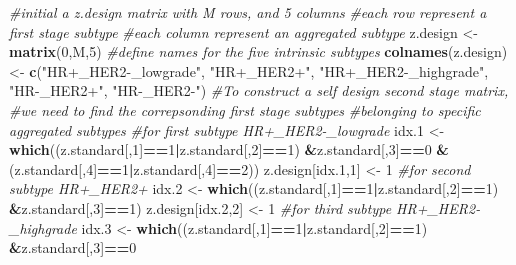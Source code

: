 \documentclass[11pt,]{article}
\newenvironment{Shaded}{\begin{snugshade}}{\end{snugshade}}
\newcommand{\KeywordTok}[1]{\textcolor[rgb]{0.13,0.29,0.53}{\textbf{#1}}}
\newcommand{\DecValTok}[1]{\textcolor[rgb]{0.00,0.00,0.81}{#1}}
\newcommand{\StringTok}[1]{\textcolor[rgb]{0.31,0.60,0.02}{#1}}
\newcommand{\CommentTok}[1]{\textcolor[rgb]{0.56,0.35,0.01}{\textit{#1}}}
\newcommand{\OperatorTok}[1]{\textcolor[rgb]{0.81,0.36,0.00}{\textbf{#1}}}
\newcommand{\NormalTok}[1]{#1}
\begin{document}
\begin{Shaded}
\begin{Highlighting}[]
\CommentTok{#initial a z.design matrix with M rows, and 5 columns}
\CommentTok{#each row represent a first stage subtype}
\CommentTok{#each column represent an aggregated subtype}
\NormalTok{z.design <-}\StringTok{ }\KeywordTok{matrix}\NormalTok{(}\DecValTok{0}\NormalTok{,M,}\DecValTok{5}\NormalTok{)}
\CommentTok{#define names for the five intrinsic subtypes}
\KeywordTok{colnames}\NormalTok{(z.design) <-}\StringTok{ }\KeywordTok{c}\NormalTok{(}\StringTok{"HR+_HER2-_lowgrade"}\NormalTok{,}
                        \StringTok{"HR+_HER2+"}\NormalTok{,}
                        \StringTok{"HR+_HER2-_highgrade"}\NormalTok{,}
                        \StringTok{"HR-_HER2+"}\NormalTok{, }
                        \StringTok{"HR-_HER2-"}\NormalTok{)}
\CommentTok{#To construct a self design second stage matrix,}
\CommentTok{#we need to find the correpsonding first stage subtypes}
\CommentTok{#belonging to specific aggregated subtypes}
\CommentTok{#for first subtype HR+_HER2-_lowgrade}
\NormalTok{idx.}\DecValTok{1}\NormalTok{ <-}\StringTok{ }\KeywordTok{which}\NormalTok{((z.standard[,}\DecValTok{1}\NormalTok{]}\OperatorTok{==}\DecValTok{1}\OperatorTok{|}\NormalTok{z.standard[,}\DecValTok{2}\NormalTok{]}\OperatorTok{==}\DecValTok{1}\NormalTok{)}
               \OperatorTok{&}\NormalTok{z.standard[,}\DecValTok{3}\NormalTok{]}\OperatorTok{==}\DecValTok{0}
               \OperatorTok{&}\NormalTok{(z.standard[,}\DecValTok{4}\NormalTok{]}\OperatorTok{==}\DecValTok{1}\OperatorTok{|}\NormalTok{z.standard[,}\DecValTok{4}\NormalTok{]}\OperatorTok{==}\DecValTok{2}\NormalTok{))}
\NormalTok{z.design[idx.}\DecValTok{1}\NormalTok{,}\DecValTok{1}\NormalTok{] <-}\StringTok{ }\DecValTok{1}
\CommentTok{#for second subtype HR+_HER2+}
\NormalTok{idx.}\DecValTok{2}\NormalTok{ <-}\StringTok{ }\KeywordTok{which}\NormalTok{((z.standard[,}\DecValTok{1}\NormalTok{]}\OperatorTok{==}\DecValTok{1}\OperatorTok{|}\NormalTok{z.standard[,}\DecValTok{2}\NormalTok{]}\OperatorTok{==}\DecValTok{1}\NormalTok{)}
               \OperatorTok{&}\NormalTok{z.standard[,}\DecValTok{3}\NormalTok{]}\OperatorTok{==}\DecValTok{1}\NormalTok{)}
\NormalTok{z.design[idx.}\DecValTok{2}\NormalTok{,}\DecValTok{2}\NormalTok{] <-}\StringTok{ }\DecValTok{1}
\CommentTok{#for third subtype HR+_HER2-_highgrade}
\NormalTok{idx.}\DecValTok{3}\NormalTok{ <-}\StringTok{ }\KeywordTok{which}\NormalTok{((z.standard[,}\DecValTok{1}\NormalTok{]}\OperatorTok{==}\DecValTok{1}\OperatorTok{|}\NormalTok{z.standard[,}\DecValTok{2}\NormalTok{]}\OperatorTok{==}\DecValTok{1}\NormalTok{)}
               \OperatorTok{&}\NormalTok{z.standard[,}\DecValTok{3}\NormalTok{]}\OperatorTok{==}\DecValTok{0}

\end{Highlighting}
\end{Shaded}
\end{document}
